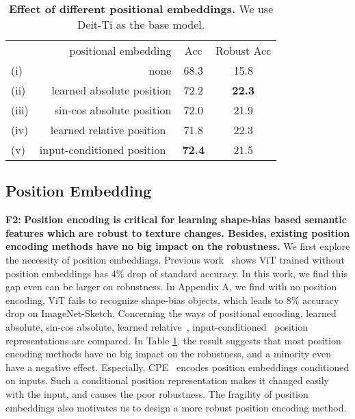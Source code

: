\documentclass[10pt,twocolumn,letterpaper]{article}
\newcommand{\tablestyle}[2]{\setlength{\tabcolsep}{#1}\renewcommand{\arraystretch}{#2}\centering\footnotesize}
\begin{document}
\begin{table}[h!]
	\vspace{-5pt}
	\centering
	\small
	\tablestyle{8pt}{1.1}
	\begin{tabular}{lr|c|c}
		&positional embedding & Acc & Robust Acc  \\
		\shline
		(i) &none   & 68.3 & 15.8 \\ 
		(ii) &learned absolute position & 72.2 & \textbf{22.3}  \\
		(iii)& sin-cos absolute position & 72.0 & 21.9  \\ 
		(iv)&learned relative position~\cite{shaw2018self} & 71.8 & 22.3 \\
		(v)&input-conditioned position~\cite{chu2021we} & \textbf{72.4} & 21.5 \\
	\end{tabular}
	\vspace{.5em}
	\caption{\textbf{Effect of different positional embeddings.} We use Deit-Ti as the base model.  
		\label{tab:analysis_posemb}
	}
	\vspace{-10pt}
\end{table}

\subsection{Position Embedding}
\label{sec:2.2}
\textbf{F2: }\textbf{Position encoding is critical for learning shape-bias based semantic features which are robust to texture changes. Besides, existing position encoding methods have no big impact on the robustness.} We first explore the necessity of position embeddings. Previous work~\cite{chu2021we} shows ViT trained without position embeddings has 4\% drop of standard accuracy. In this work, we find this gap even can be larger on robustness. In Appendix A, we find with no position encoding, ViT fails to recognize shape-bias objects, which leads to 8\% accuracy drop on ImageNet-Sketch. Concerning the ways of positional encoding, learned absolute, sin-cos absolute, learned relative~\cite{shaw2018self}, input-conditioned~\cite{chu2021we} position representations are compared. In Table \ref{tab:analysis_posemb}, the result suggests that most position encoding methods have no big impact on the robustness, and a minority even have a negative effect. Especially, CPE~\cite{chu2021we} encodes position embeddings conditioned on inputs. Such a conditional position representation makes it changed easily with the input, and causes the poor robustness. The fragility of position embeddings also motivates us to design a more robust position encoding method. 
\end{document}
